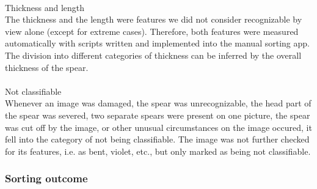  \\
Thickness and length \\
The thickness and the length were features we did not consider recognizable by view alone (except for extreme cases). Therefore, both features were measured automatically with scripts written and implemented into the manual sorting app. The division into different categories of thickness can be inferred by the overall thickness of the spear. \\
 \\
Not classifiable \\
Whenever an image was damaged, the spear was unrecognizable, the head part of the spear was severed, two separate spears were present on one picture, the spear was cut off by the image, or other unusual circumstances on the image occured, it fell into the category of not being classifiable. The image was not further checked for its features, i.e. as bent, violet, etc., but only marked as being not classifiable.



\subsubsection{Sorting outcome}

